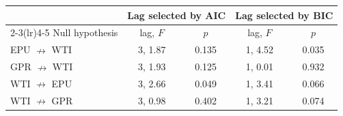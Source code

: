 \begin{tabular}{lcccc}
\toprule
 & \multicolumn{2}{c}{Lag selected by AIC} & \multicolumn{2}{c}{Lag selected by BIC} \\
\cmidrule(lr){2-3}\cmidrule(lr){4-5}
Null hypothesis & lag, $F$ & $p$ & lag, $F$ & $p$ \\
\midrule
EPU $\nrightarrow$ WTI & 3, 1.87 & 0.135 & 1, 4.52 & 0.035 \\
GPR $\nrightarrow$ WTI & 3, 1.93 & 0.125 & 1, 0.01 & 0.932 \\
WTI $\nrightarrow$ EPU & 3, 2.66 & 0.049 & 1, 3.41 & 0.066 \\
WTI $\nrightarrow$ GPR & 3, 0.98 & 0.402 & 1, 3.21 & 0.074 \\
\bottomrule
\end{tabular}
